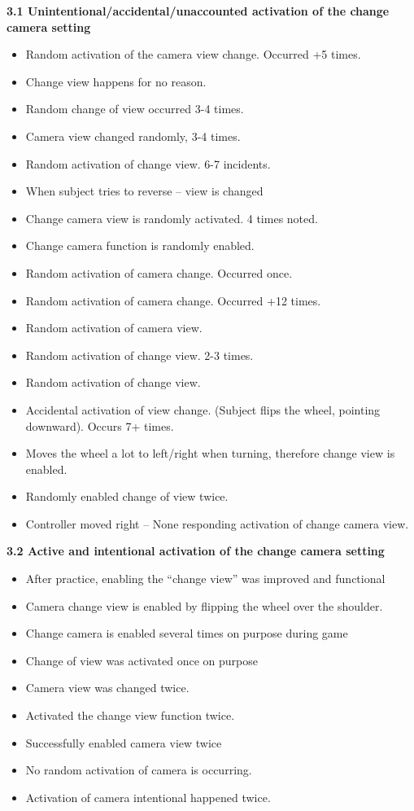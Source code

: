 \noindent\textbf{3.1 Unintentional/accidental/unaccounted activation of the change camera setting}
\begin{itemize}
\item Random activation of the camera view change. Occurred +5 times.
\item Change view happens for no reason.
\item Random change of view occurred 3-4 times.
\item Camera view changed randomly, 3-4 times.
\item Random activation of change view. 6-7 incidents.
\item When subject tries to reverse – view is changed
\item Change camera view is randomly activated. 4 times noted.
\item Change camera function is randomly enabled.
\item Random activation of camera change. Occurred once.
\item Random activation of camera change. Occurred +12 times.
\item Random activation of camera view.
\item Random activation of change view. 2-3 times.
\item Random activation of change view.
\item Accidental activation of view change. (Subject flips the wheel, pointing downward). Occurs 7+ times.
\item Moves the wheel a lot to left/right when turning, therefore change view is enabled.
\item Randomly enabled change of view twice.
\item Controller moved right – None responding activation of change camera view.
\end{itemize}

\noindent\textbf{3.2 Active and intentional activation of the change camera setting}
\begin{itemize}
\item After practice, enabling the “change view” was improved and functional
\item Camera change view is enabled by flipping the wheel over the shoulder.
\item Change camera is enabled several times on purpose during game
\item Change of view was activated once on purpose
\item Camera view was changed twice.
\item Activated the change view function twice.
\item Successfully enabled camera view twice
\item No random activation of camera is occurring.
\item Activation of camera intentional happened twice.
\end{itemize}

